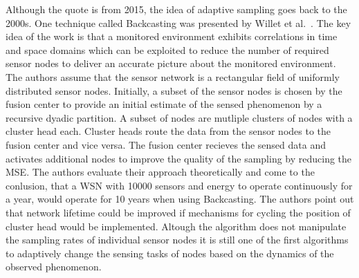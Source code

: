\par
Although the quote is from 2015, the idea of adaptive sampling goes back to the
2000s. One technique called Backcasting was presented by Willet et
al.~\cite{willett2004backcasting}. The key idea of the work is that a monitored
environment exhibits correlations in time and space domains which can be
exploited to reduce the number of required sensor nodes to deliver an accurate
picture about the monitored environment. The authors assume that the sensor
network is a rectangular field of uniformly distributed sensor nodes.
Initially, a subset of the sensor nodes is chosen by the fusion center to
provide an initial estimate of the sensed phenomenon by a recursive dyadic
partition. A subset of nodes are mutliple clusters of nodes with a cluster head
each. Cluster heads route the data from the sensor nodes to the fusion center
and vice versa. The fusion center recieves the sensed data and activates
additional nodes to improve the quality of the sampling by reducing the
\ac{MSE}. The authors evaluate their approach theoretically and come to the
conlusion, that a \ac{WSN} with 10000 sensors and energy to operate
continuously for a year, would operate for 10 years when using Backcasting. The
authors point out that network lifetime could be improved if mechanisms for
cycling the position of cluster head would be implemented. Altough the
algorithm does not manipulate the sampling rates of individual sensor nodes it
is still one of the first algorithms to adaptively change the sensing tasks of
nodes based on the dynamics of the observed phenomenon.

\par


